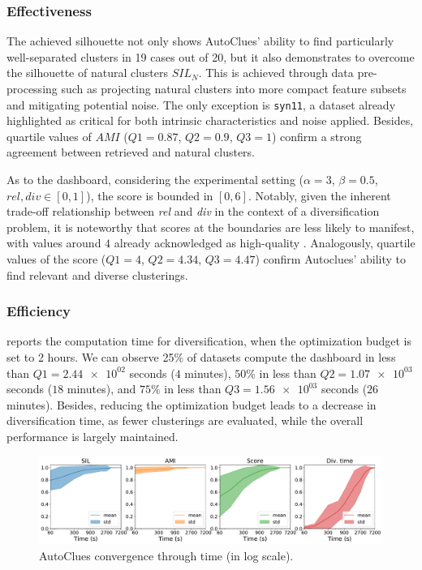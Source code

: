 \subsubsection{Effectiveness}\label{sssec:effectiveness}
The achieved silhouette not only shows AutoClues' ability to find particularly well-separated clusters in 19 cases out of 20, but it also demonstrates to overcome the silhouette of natural clusters $SIL_N$. 
This is achieved through data pre-processing such as projecting natural clusters into more compact feature subsets and mitigating potential noise.
The only exception is \texttt{syn11}, a dataset already highlighted as critical for both intrinsic characteristics and noise applied. 
Besides, quartile values of $AMI$ ($Q1=0.87$, $Q2=0.9$, $Q3=1$) confirm a strong agreement between retrieved and natural clusters. 

As to the dashboard, considering the experimental setting ($\alpha=3$, $\beta=0.5$,  $rel, div \in [0, 1]$), the score is bounded in $[0, 6]$.
Notably, given the inherent trade-off relationship between \textit{rel} and \textit{div} in the context of a diversification problem, it is noteworthy that scores at the boundaries are less likely to manifest,
with values around $4$ already acknowledged as high-quality \cite{vieira2011query}.
Analogously, quartile values of the score ($Q1=4$, $Q2=4.34$, $Q3=4.47$) confirm Autoclues' ability to find relevant and diverse clusterings.

\subsubsection{Efficiency}\label{sssec:efficiency}
 reports the computation time for diversification, when the optimization budget is set to 2 hours.
We can observe 25\% of datasets compute the dashboard in less than $Q1=\num{2.44e02}$ seconds ($4$ minutes), $50\%$ in less than $Q2=\num{1.07e03}$ seconds ($18$ minutes), and $75\%$ in less than $Q3=\num{1.56e03}$ seconds ($26$ minutes).
Besides, reducing the optimization budget leads to a decrease in diversification time, as fewer clusterings are evaluated, while the overall performance is largely maintained.

\begin{figure}[t]
    \centering
    \includegraphics[scale=.3]{chapters/data-centric/unsupervised/img/all.pdf}
    \caption{AutoClues convergence through time (in log scale).}
    \label{clustering-fig:convergence}
\end{figure}

